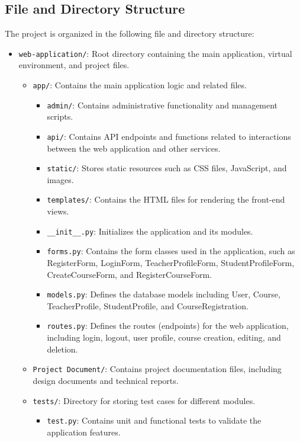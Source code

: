 \documentclass[12pt]{article}
\begin{document}
\subsection{File and Directory Structure}
The project is organized in the following file and directory structure:
\begin{itemize}
    \item \texttt{web-application/}: Root directory containing the main application, virtual environment, and project files.
    \begin{itemize}
        \item \texttt{app/}: Contains the main application logic and related files.
        \begin{itemize}
            \item \texttt{admin/}: Contains administrative functionality and management scripts.
            \item \texttt{api/}: Contains API endpoints and functions related to interactions between the web application and other services.
            \item \texttt{static/}: Stores static resources such as CSS files, JavaScript, and images.
            \item \texttt{templates/}: Contains the HTML files for rendering the front-end views.
            \item \texttt{\_\_init\_\_.py}: Initializes the application and its modules.
            \item \texttt{forms.py}: Contains the form classes used in the application, such as RegisterForm, LoginForm, TeacherProfileForm, StudentProfileForm, CreateCourseForm, and RegisterCourseForm.
            \item \texttt{models.py}: Defines the database models including User, Course, TeacherProfile, StudentProfile, and CourseRegistration.
            \item \texttt{routes.py}: Defines the routes (endpoints) for the web application, including login, logout, user profile, course creation, editing, and deletion.
        \end{itemize}
        \item \texttt{Project Document/}: Contains project documentation files, including design documents and technical reports.
        \item \texttt{tests/}: Directory for storing test cases for different modules.
        \begin{itemize}
            \item \texttt{test.py}: Contains unit and functional tests to validate the application features.

\end{itemize}
\end{itemize}
\end{itemize}
\end{document}

